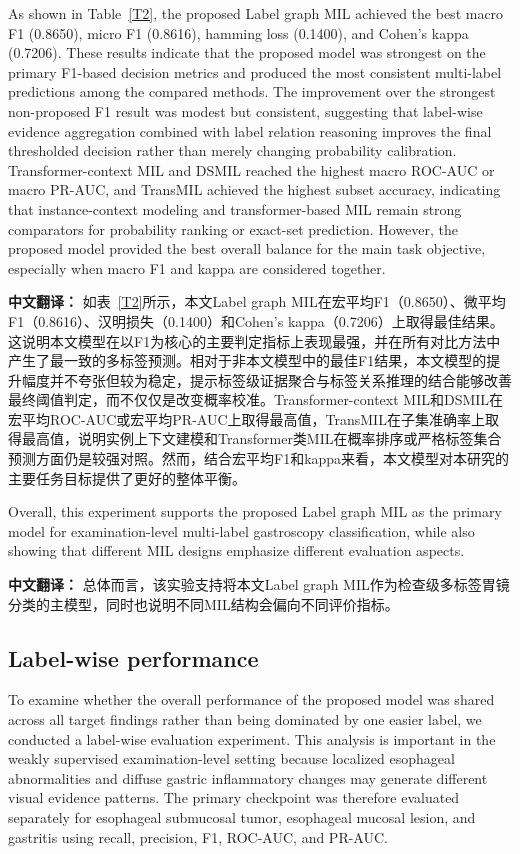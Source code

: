 \documentclass[Afour,sagev,times]{sagej}
\begin{document}
As shown in Table~\ref{T2}, the proposed Label graph MIL achieved the best macro F1 (0.8650), micro F1 (0.8616), hamming loss (0.1400), and Cohen's kappa (0.7206). These results indicate that the proposed model was strongest on the primary F1-based decision metrics and produced the most consistent multi-label predictions among the compared methods. The improvement over the strongest non-proposed F1 result was modest but consistent, suggesting that label-wise evidence aggregation combined with label relation reasoning improves the final thresholded decision rather than merely changing probability calibration. Transformer-context MIL and DSMIL reached the highest macro ROC-AUC or macro PR-AUC, and TransMIL achieved the highest subset accuracy, indicating that instance-context modeling and transformer-based MIL remain strong comparators for probability ranking or exact-set prediction. However, the proposed model provided the best overall balance for the main task objective, especially when macro F1 and kappa are considered together.

\textbf{中文翻译：} 如表~\ref{T2}所示，本文Label graph MIL在宏平均F1（0.8650）、微平均F1（0.8616）、汉明损失（0.1400）和Cohen's kappa（0.7206）上取得最佳结果。这说明本文模型在以F1为核心的主要判定指标上表现最强，并在所有对比方法中产生了最一致的多标签预测。相对于非本文模型中的最佳F1结果，本文模型的提升幅度并不夸张但较为稳定，提示标签级证据聚合与标签关系推理的结合能够改善最终阈值判定，而不仅仅是改变概率校准。Transformer-context MIL和DSMIL在宏平均ROC-AUC或宏平均PR-AUC上取得最高值，TransMIL在子集准确率上取得最高值，说明实例上下文建模和Transformer类MIL在概率排序或严格标签集合预测方面仍是较强对照。然而，结合宏平均F1和kappa来看，本文模型对本研究的主要任务目标提供了更好的整体平衡。

Overall, this experiment supports the proposed Label graph MIL as the primary model for examination-level multi-label gastroscopy classification, while also showing that different MIL designs emphasize different evaluation aspects.

\textbf{中文翻译：} 总体而言，该实验支持将本文Label graph MIL作为检查级多标签胃镜分类的主模型，同时也说明不同MIL结构会偏向不同评价指标。

\subsection{Label-wise performance}
To examine whether the overall performance of the proposed model was shared across all target findings rather than being dominated by one easier label, we conducted a label-wise evaluation experiment. This analysis is important in the weakly supervised examination-level setting because localized esophageal abnormalities and diffuse gastric inflammatory changes may generate different visual evidence patterns. The primary checkpoint was therefore evaluated separately for esophageal submucosal tumor, esophageal mucosal lesion, and gastritis using recall, precision, F1, ROC-AUC, and PR-AUC.
\end{document}
